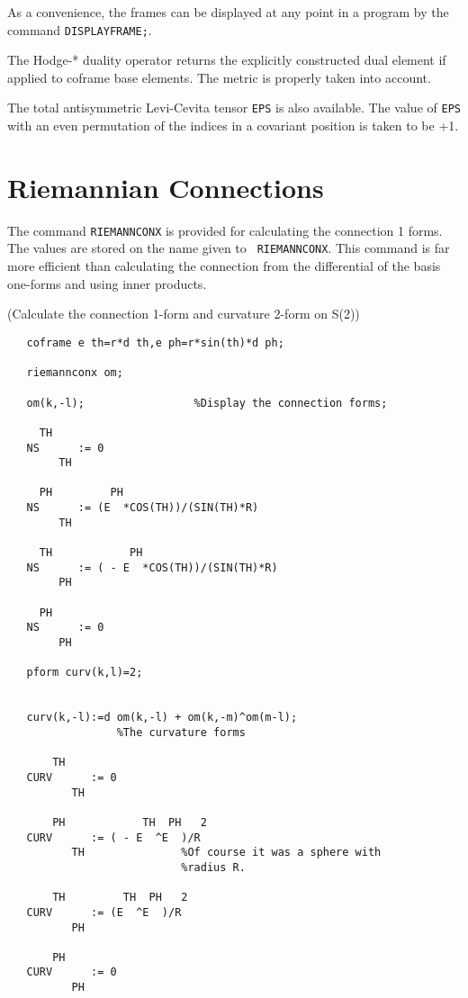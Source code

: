  
As a convenience, the frames can be displayed at any point in a program
by the command {\tt DISPLAYFRAME;}\label{DISPLAYFRAME}.

The Hodge-* duality operator returns the explicitly constructed dual
element if applied to coframe base elements. The metric is properly
taken into account.

 
The total antisymmetric Levi-Cevita tensor {\tt EPS}\label{EPS} is
also available.  The value of {\tt EPS} with an even permutation of the
indices in a covariant position is taken to be +1.


\section{Riemannian Connections}

The command {\tt RIEMANNCONX} is provided for calculating the
 \label{RIEMANNCONX}
connection 1 forms.  The values are stored on the name given to {\tt
RIEMANNCONX}.  This command is far more efficient than calculating the
connection from the differential of the basis one-forms and using
inner products.

\example (Calculate the connection 1-form and curvature 2-form on S(2))

\begin{verbatim}
   coframe e th=r*d th,e ph=r*sin(th)*d ph;

   riemannconx om;

   om(k,-l);                 %Display the connection forms;

     TH
   NS      := 0
        TH

     PH         PH
   NS      := (E  *COS(TH))/(SIN(TH)*R)
        TH

     TH            PH
   NS      := ( - E  *COS(TH))/(SIN(TH)*R)
        PH

     PH
   NS      := 0
        PH

   pform curv(k,l)=2;


   curv(k,-l):=d om(k,-l) + om(k,-m)^om(m-l);
                 %The curvature forms

       TH
   CURV      := 0
          TH

       PH            TH  PH   2
   CURV      := ( - E  ^E  )/R  
          TH               %Of course it was a sphere with
                           %radius R.

       TH         TH  PH   2
   CURV      := (E  ^E  )/R
          PH

       PH
   CURV      := 0
          PH
\end{verbatim}

